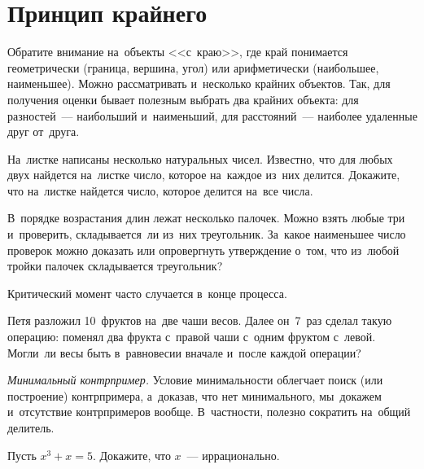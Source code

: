 
\section*{Принцип крайнего}



Обратите внимание на~объекты <<с~краю>>, где край понимается геометрически
(граница, вершина, угол) или арифметически (наибольшее, наименьшее).
Можно рассматривать и~несколько крайних объектов.
Так, для получения оценки бывает полезным выбрать два крайних объекта: для
разностей~--- наибольший и~наименьший, для расстояний~--- наиболее удаленные
друг от~друга.

\begin{problems}

\item
На~листке написаны несколько натуральных чисел.
Известно, что для любых двух найдется на~листке число, которое на~каждое из~них
делится.
Докажите, что на~листке найдется число, которое делится на~все числа.

\item
В~порядке возрастания длин лежат несколько палочек.
Можно взять любые три и~проверить, складывается~ли из~них треугольник.
За~какое наименьшее число проверок можно доказать или опровергнуть утверждение
о~том, что из~любой тройки палочек складывается треугольник?

\end{problems}

Критический момент часто случается в~конце процесса.

\begin{problems}

\item
Петя разложил 10~фруктов на~две чаши весов.
Далее он~7~раз сделал такую операцию: поменял два фрукта с~правой чаши с~одним
фруктом с~левой.
Могли~ли весы быть в~равновесии вначале и~после каждой операции?

\end{problems}

\emph{Минимальный контрпример.}
Условие минимальности облегчает поиск (или построение) контрпримера, а~доказав,
что нет минимального, мы~докажем и~отсутствие контрпримеров вообще.
В~частности, полезно сократить на~общий делитель.

\begin{problems}

\item
Пусть $x^3 + x = 5$.
Докажите, что $x$~--- иррационально.

\end{problems}

